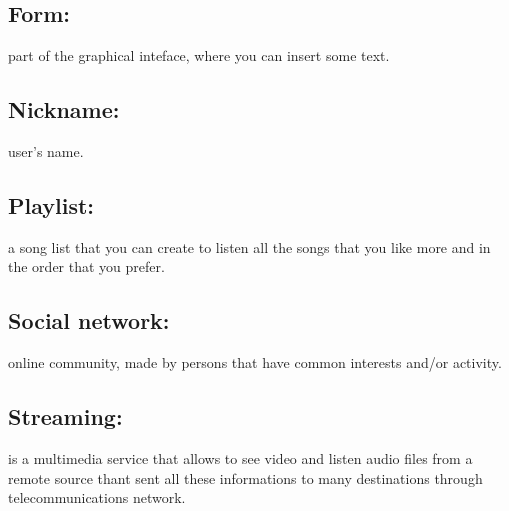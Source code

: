 \subsection*{Form:} part of the graphical inteface, where you can insert some
text. 
\subsection*{Nickname:} user's name.
\subsection*{Playlist:} a song list that you can create to listen all the songs
that you like more and in the order that you prefer. 
\subsection*{Social network:} online community, made by persons that have common interests
and/or activity.
\subsection*{Streaming:} is a multimedia service that allows to see video and
listen audio files from a remote source thant sent all these informations to
many destinations through telecommunications network.

